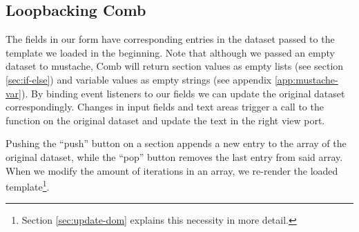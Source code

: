 \documentclass[thesis.tex]{subfiles}
\begin{document}
\subsection{Loopbacking Comb}
\label{sec:loopbacking}
The fields in our form have corresponding entries in the dataset passed to
the template we loaded in the beginning.
Note that although we passed an empty dataset to mustache, Comb will return
section values as empty lists (see section \ref{sec:if-else}) and
variable values as empty strings (see appendix \ref{app:mustache-var}).
By binding event listeners to our fields we can update the original dataset
correspondingly. Changes in input fields and text areas trigger a call to the
 function on the original dataset and update the text in the
right view port.

Pushing the ``push'' button on a section appends a new entry to the array of the
original dataset, while the ``pop'' button removes the last entry from said array.
When we modify the amount of iterations in an array, we re-render the loaded
template\footnote{Section \ref{sec:update-dom} explains this necessity
in more detail.}.
\end{document}
